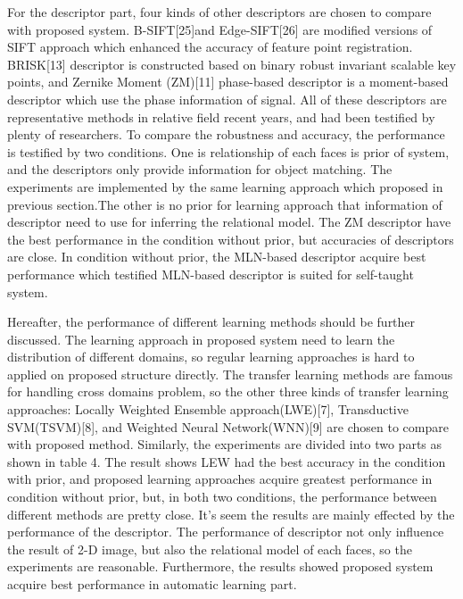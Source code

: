 \documentclass[journal]{IEEEtran}
\begin{document}
For the descriptor part, four kinds of other descriptors are chosen to compare with proposed system. B-SIFT[25]and Edge-SIFT[26] are modified versions of SIFT approach which enhanced the accuracy of feature point registration. BRISK[13] descriptor is constructed based on binary robust invariant scalable key points, and Zernike Moment (ZM)[11] phase-based descriptor is a moment-based descriptor which use the phase information of signal. All of these descriptors are representative methods in relative field recent years, and had been testified by plenty of researchers. To compare the robustness and accuracy, the performance is testified by two conditions. One is relationship of each faces is prior of system, and the descriptors only provide information for object matching. The experiments are implemented by the same learning approach which proposed in previous section.The other is no prior for learning approach that information of descriptor need to use for inferring the relational model. The ZM descriptor have the best performance in the condition without prior, but accuracies of descriptors are close. In condition without prior, the MLN-based descriptor acquire best performance which testified MLN-based descriptor is suited for self-taught system. 

Hereafter, the performance of different learning methods should be further discussed. The learning approach in proposed system need to learn the distribution of different domains, so regular learning approaches is hard to applied on proposed structure directly. The transfer learning methods are famous for handling cross domains problem, so the other three kinds of transfer learning approaches: Locally Weighted Ensemble approach(LWE)[7], Transductive SVM(TSVM)[8], and Weighted Neural Network(WNN)[9] are chosen to compare with proposed method. Similarly, the experiments are divided into two parts as shown in table 4. The result shows LEW had the best accuracy in the condition with prior, and proposed learning approaches acquire greatest performance in condition without prior, but, in both two conditions, the performance between different methods are pretty close. It's seem the results are mainly effected by the performance of the descriptor. The performance of descriptor not only influence the result of 2-D image, but also the relational model of each faces, so the experiments are reasonable. Furthermore, the results showed proposed system acquire best performance in automatic learning part.  

\newcommand{\tabincell}[2]{\begin{tabular}{@{}#1@{}}#2\end{tabular}}
\end{document}
